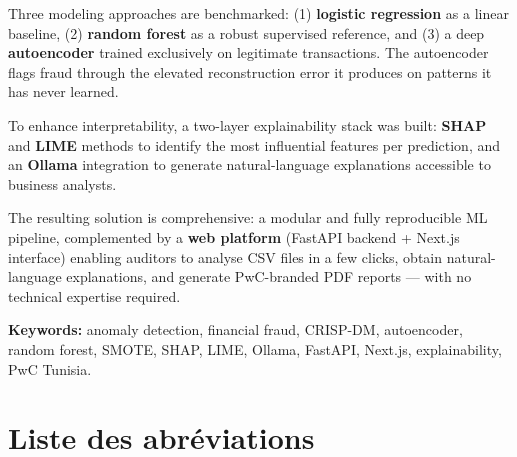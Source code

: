 \documentclass[12pt,a4paper,twoside]{report}
\begin{document}
Three modeling approaches are benchmarked: (1) \textbf{logistic regression} as a linear baseline, (2) \textbf{random forest} as a robust supervised reference, and (3) a deep \textbf{autoencoder} trained exclusively on legitimate transactions. The autoencoder flags fraud through the elevated reconstruction error it produces on patterns it has never learned.

To enhance interpretability, a two-layer explainability stack was built: \textbf{SHAP} and \textbf{LIME} methods to identify the most influential features per prediction, and an \textbf{Ollama} integration to generate natural-language explanations accessible to business analysts.

The resulting solution is comprehensive: a modular and fully reproducible ML pipeline, complemented by a \textbf{web platform} (FastAPI backend + Next.js interface) enabling auditors to analyse CSV files in a few clicks, obtain natural-language explanations, and generate PwC-branded PDF reports — with no technical expertise required.

\vspace{0.5cm}
\textbf{Keywords:} anomaly detection, financial fraud, CRISP-DM, autoencoder, random forest, SMOTE, SHAP, LIME, Ollama, FastAPI, Next.js, explainability, PwC Tunisia.

\newpage

\tableofcontents
\newpage

\listoffigures
{}
\newpage

\listoftables
{}
\newpage

\chapter*{Liste des abréviations}
\end{document}

